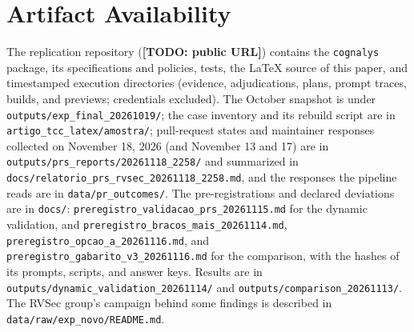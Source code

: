 \documentclass[conference]{IEEEtran}
\newcommand{\pending}[1]{\textbf{[TODO: #1]}}
\begin{document}
\section*{Artifact Availability}

The replication repository (\pending{public URL}) contains the
\texttt{cognalys} package, its specifications and policies, tests, the LaTeX
source of this paper, and timestamped execution directories (evidence,
adjudications, plans, prompt traces, builds, and previews; credentials
excluded). The October snapshot
is under \texttt{outputs/exp\_final\_20261019/}; the case inventory and its
rebuild script are in \texttt{artigo\_tcc\_latex/amostra/}; pull-request states
and maintainer responses collected on November 18, 2026 (and November 13 and 17) are
in \texttt{outputs/prs\_reports/20261118\_2258/} and summarized in
\texttt{docs/}\allowbreak\texttt{relatorio\_prs\_rvsec\_20261118\_2258.md}, and the responses the pipeline reads are in
\texttt{data/pr\_outcomes/}. The pre-registrations and declared deviations are
in \texttt{docs/}: \texttt{preregistro\_validacao\_prs\_20261115.md} for the
dynamic validation, and \texttt{preregistro\_bracos\_mais\_20261114.md},
\texttt{preregistro\_opcao\_a\_20261116.md}, and
\texttt{preregistro\_gabarito\_v3\_20261116.md} for the comparison, with the
hashes of its prompts, scripts, and answer keys. Results are in
\texttt{outputs/dynamic\_validation\_20261114/} and
\texttt{outputs/comparison\_20261113/}. The RVSec group's campaign behind
some findings is described in \texttt{data/raw/exp\_novo/README.md}.



\end{document}
